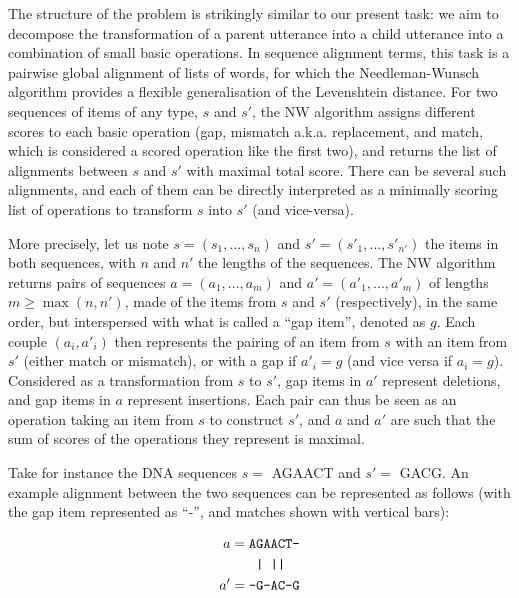 The structure of the problem is strikingly similar to our present task:
we aim to decompose the transformation of a parent utterance into a
child utterance into a combination of small basic operations. In
sequence alignment terms, this task is a pairwise global alignment of
lists of words, for which the Needleman-Wunsch algorithm
\autocite[henceforth NW]{needleman_general_1970} provides a flexible
generalisation of the Levenshtein distance. For two sequences of items
of any type, \(s\) and \(s'\), the NW algorithm assigns different scores
to each basic operation (gap, mismatch a.k.a. replacement, and match,
which is considered a scored operation like the first two), and returns
the list of alignments between \(s\) and \(s'\) with maximal total
score. There can be several such alignments, and each of them can be
directly interpreted as a minimally scoring list of operations to
transform \(s\) into \(s'\) (and vice-versa).

More precisely, let us note \(s = (s_1, ..., s_n)\) and
\(s' = (s'_1, ..., s'_{n'})\) the items in both sequences, with \(n\)
and \(n'\) the lengths of the sequences. The NW algorithm returns pairs
of sequences \(a = (a_1, ..., a_m)\) and \(a' = (a'_1, ..., a'_m)\) of lengths \(m \geq \max(n, n')\), made of
the items from \(s\) and \(s'\) (respectively), in the same order, but
interspersed with what is called a \enquote{gap item}, denoted as \(g\). 
Each couple \((a_i, a'_i)\) then represents
the pairing of an item from \(s\) with an item from \(s'\) (either match
or mismatch), or with a gap if \(a'_i = g\) (and vice versa if
\(a_i = g\)). Considered as a transformation from \(s\) to \(s'\), gap
items in \(a'\) represent deletions, and gap items in \(a\) represent
insertions. Each pair can thus be seen as an operation taking an item
from \(s\) to construct \(s'\), and \(a\) and \(a'\) are such that the
sum of scores of the operations they represent is maximal.

Take for instance the DNA sequences \(s =\) AGAACT and \(s' =\) GACG. An
example alignment between the two sequences can be represented as
follows (with the gap item represented as \enquote{-}, and matches shown
with vertical bars):

\begin{align*}
  a  = {} & \text{\texttt{AGAACT-}} \\
       {} & \text{\texttt{  | ||}} \\
  a' = {} & \text{\texttt{-G-AC-G}}
\end{align*}

